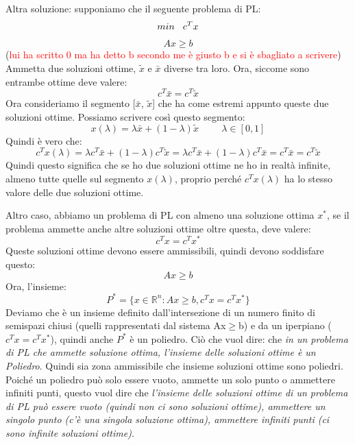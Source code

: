 \noindent Altra soluzione: supponiamo che il seguente problema di PL:
\begin{equation*}
    min \hspace{0.3cm} c^Tx
\end{equation*}
\begin{equation*}
    Ax \geq b
\end{equation*}
(\textcolor{red}{lui ha scritto 0 ma ha detto b secondo me è giusto b e si è sbagliato a scrivere}) Ammetta due soluzioni ottime, $\tilde{x}$ e $\bar{x}$ diverse tra loro. Ora, siccome sono entrambe ottime deve valere:
\begin{equation*}
    c^T\bar{x} = c^T\tilde{x}
\end{equation*}
Ora consideriamo il segmento [$\bar{x}$, $\tilde{x}$] che ha come estremi appunto queste due soluzioni ottime. Possiamo scrivere così questo segmento:
\begin{equation*}
    x(\lambda) = \lambda\bar{x} + (1 - \lambda)\tilde{x} \hspace{1cm} \lambda \in [0,1]
\end{equation*}
Quindi è vero che:
\begin{equation*}
    c^Tx(\lambda) = \lambda c^T\bar{x} + (1-\lambda)c^T\tilde{x} = \lambda c^T\bar{x} + (1-\lambda)c^T\bar{x} = c^T\bar{x} = c^T\tilde{x}
\end{equation*}
Quindi questo significa che se ho due soluzioni ottime ne ho in realtà infinite, almeno tutte quelle sul segmento $x(\lambda)$, proprio perché $c^Tx(\lambda)$ ha lo stesso valore delle due soluzioni ottime.

\vspace{1cm}

\noindent Altro caso, abbiamo un problema di PL con almeno una soluzione ottima $x^*$, se il problema ammette anche altre soluzioni ottime oltre questa, deve valere:
\begin{equation*}
    c^Tx = c^Tx^*
\end{equation*}
Queste soluzioni ottime devono essere ammissibili, quindi devono soddisfare questo:
\begin{equation*}
    Ax \geq b
\end{equation*} 
Ora, l'insieme:
\begin{equation*}
    P^* = \{x \in \mathbb{R}^n: Ax \geq b, c^Tx = c^Tx^*\}
\end{equation*}
Deviamo che è un insieme definito dall'intersezione di un numero finito di semispazi chiusi (quelli rappresentati dal sistema Ax$\geq$b) e da un iperpiano ($c^Tx = c^Tx^*$), quindi anche $P^*$ è un poliedro. Ciò che vuol dire: che \textit{in un problema di PL che ammette soluzione ottima, l'insieme delle soluzioni ottime è un Poliedro}. Quindi sia zona ammissibile che insieme soluzioni ottime sono poliedri. Poiché un poliedro può solo essere vuoto, ammette un solo punto o ammettere infiniti punti, questo vuol dire che \textit{l'insieme delle soluzioni ottime di un problema di PL può essere vuoto (quindi non ci sono soluzioni ottime), ammettere un singolo punto (c'è una singola soluzione ottima), ammettere infiniti punti (ci sono infinite soluzioni ottime)}.

